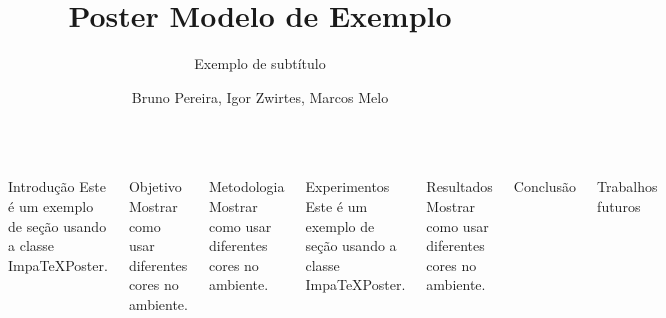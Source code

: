 \documentclass[palette=basic,mode=light]{impaTeXPoster}
\title{Poster Modelo de Exemplo}
\subtitle{Exemplo de subtítulo}
\author{Bruno Pereira, Igor Zwirtes, Marcos Melo}
\begin{document}
\leftlogosize{20cm}{20cm}
\rightlogosize{12cm}{8cm}

\maketitle

\begin{columns}


\begin{postercard}{Introdução}
Este é um exemplo de seção usando a classe ImpaTeXPoster.

\lipsum[1]
\lipsum[1]
\end{postercard}


\begin{postercard}{Objetivo}
Mostrar como usar diferentes cores no ambiente.

\lipsum[2]
\end{postercard}

\begin{postercard}{Metodologia}
Mostrar como usar diferentes cores no ambiente.

\lipsum[2]
\end{postercard}


\begin{postercard}{Experimentos}
Este é um exemplo de seção usando a classe ImpaTeXPoster.

\lipsum[1]
\end{postercard}


\begin{postercard}{Resultados}
Mostrar como usar diferentes cores no ambiente.

\lipsum[2]
\lipsum[1]
\lipsum[3]
\end{postercard}


\begin{postercard}{Conclusão}
\lipsum[4]
\end{postercard}

\begin{postercard}{Trabalhos futuros}
\lipsum[3]
\end{postercard}

\end{columns}
\end{document}
